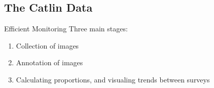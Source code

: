 \documentclass{beamer}
\begin{document}
        \subsection{The Catlin Data}
            \begin{frame}{Efficient Monitoring}
                Three main stages:
                  \begin{enumerate}
                    \item Collection of images
                    \item Annotation of images
                    \item Calculating proportions, and visualing trends between surveys
                  \end{enumerate}
            \end{frame}
\end{document}
